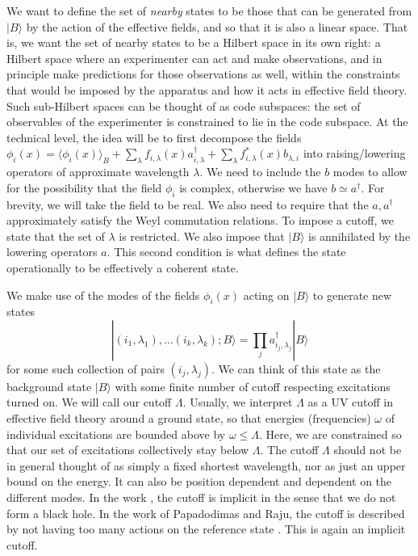 \documentclass[12pt,nofootinbib, longbibliography]{revtex4-1}
\newcommand\vev[1]{\langle #1\rangle}
\newcommand\ket[1]{| #1\rangle}
\begin{document}
We want to define the set of {\em nearby} states to be those that can be generated from $\ket B$ by the action of the effective fields, and so that it is also a linear space. That is, we want the set of nearby states to be a Hilbert space in its own right: a Hilbert space where an experimenter can act and make observations, and in principle make predictions for those observations as well, within the constraints that would be imposed by the apparatus and how it acts in effective field theory.  Such sub-Hilbert spaces can be thought of as code subspaces: the set of observables of the experimenter is constrained to lie in the code subspace. At the technical level, the idea will be to first decompose the fields $\phi_i(x)= \vev{\phi_i(x)}_B + \sum_{\lambda} f_{i,\lambda}(x)a^\dagger_{i,\lambda}+ \sum_{\lambda} f^*_{i,\lambda}(x)b_{\lambda,i}$
into raising/lowering operators of approximate wavelength $\lambda$. We need to include the $b$ modes to allow for the possibility that the field $\phi_i$ is complex, otherwise we have $b\simeq a^\dagger$. For brevity, we will take the field to be real. We also need to require that the $a, a^\dagger$ approximately satisfy the Weyl commutation relations. To impose a cutoff, we state that the set of $\lambda$ is restricted. We also impose that $\ket B$ is annihilated by the lowering operators $a$. This second condition is what defines the state operationally to be effectively a coherent state.

We make use of the  modes of the fields $\phi_i(x)$ acting on $\ket B$ to generate new states
\begin{equation} 
\ket{(i_1, \lambda_1), \dots (i_k, \lambda_k) ;B} = \prod_{j}  a^\dagger_{i_j,\lambda_j} \ket B
\end{equation}
for some such collection of pairs $(i_j,\lambda_j)$. We can think of this state as the background state $\ket B$ with some finite number of cutoff respecting excitations turned on. We will call our cutoff $\Lambda$. Usually, we interpret $\Lambda$ as a UV cutoff in effective field theory around a ground state, so that energies (frequencies) $\omega$ of individual excitations are bounded above by $\omega\leq\Lambda$. Here, we are constrained so that our set of excitations collectively stay below $\Lambda$. The cutoff $\Lambda$ should not be  in general thought of as simply a fixed shortest wavelength, nor as just an upper bound on the energy. It can also be position dependent and dependent on the different modes. In the work \cite{Almheiri:2014lwa}, the cutoff is implicit in the sense that we do not form a black hole. In the work of Papadodimas and Raju, the cutoff is described by not having too many actions on the reference state \cite{Papadodimas:2013jku}. This is again an implicit cutoff.
 
\end{document}
